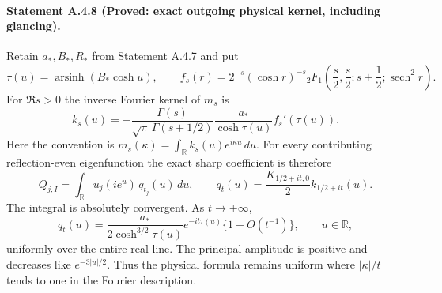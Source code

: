 \paragraph{Statement A.4.8 (Proved: exact outgoing physical kernel, including glancing).}
Retain $a_*,B_*,R_*$ from Statement A.4.7 and put
\[
 \tau(u)=\operatorname{arsinh}(B_*\cosh u),\qquad
 f_s(r)=2^{-s}(\cosh r)^{-s}
 {}_2F_1\!\left(\frac s2,\frac s2;s+\frac12;\operatorname{sech}^2r\right).
\]
For $\Re s>0$ the inverse Fourier kernel of $m_s$ is
\begin{equation}\label{A:exact-physical-kernel}
 k_s(u)=-\frac{\Gamma(s)}{\sqrt\pi\,\Gamma(s+1/2)}
          \frac{a_*}{\cosh\tau(u)}f_s'(\tau(u)).
\end{equation}
Here the convention is
$m_s(\kappa)=\int_{\mathbb R}k_s(u)e^{i\kappa u}\,du$.
For every contributing reflection-even eigenfunction the exact sharp
coefficient is therefore
\begin{equation}\label{A:Q-physical}
 Q_{j,I}=\int_{\mathbb R}u_j(i e^u)\,q_{t_j}(u)\,du,
 \qquad q_t(u)=\frac{K_{1/2+it,0}}2 k_{1/2+it}(u).
\end{equation}
The integral is absolutely convergent. As $t\to+\infty$,
\begin{equation}\label{A:physical-principal-symbol}
 q_t(u)=
 \frac{a_*}{2\cosh^{3/2}\tau(u)}
       e^{-it\tau(u)}\{1+O(t^{-1})\},
 \qquad u\in\mathbb R,
\end{equation}
uniformly over the entire real line.
The principal amplitude is positive and decreases like
$e^{-3|u|/2}$. Thus the physical formula remains uniform where
$|\kappa|/t$ tends to one in the Fourier description.

